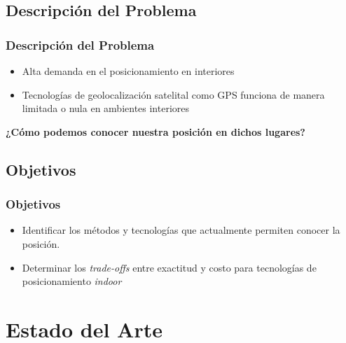 \documentclass[mathserif]{beamer}
\begin{document}
\subsection{Descripción del Problema}

\begin{frame}
\frametitle{Descripción del Problema}

\begin{itemize}

\item Alta demanda en el posicionamiento en interiores
\pause
\item Tecnologías de geolocalización satelital como GPS funciona de manera limitada o nula en ambientes interiores

\end{itemize}

\pause
\vspace*{.5cm}
\textbf{¿Cómo podemos conocer nuestra posición en dichos lugares? }




\end{frame}


\subsection{Objetivos} %

\begin{frame}
\frametitle{Objetivos}

\begin{itemize}
\item Identificar los métodos y tecnologías que actualmente permiten conocer la posición.
\pause
\item Determinar los \textit{trade-offs} entre exactitud y costo para tecnologías de posicionamiento \textit{indoor}
\end{itemize}

\end{frame}

\section{Estado del Arte}
\end{document}
